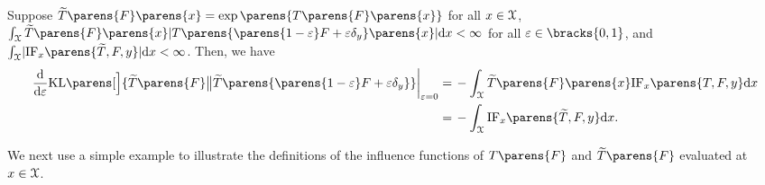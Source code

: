 \begin{proposition}\label{prop-inf-fun-relationship-den-logden-kldiv}
	Suppose $\widetilde{T} \parens{F} \parens{x} = \exp \parens{T \parens{F} \parens{x}}$ for all $x \in \mathcal{X}$, $\int_{\calX} \widetilde{T} \parens{F} \parens{x} \abs{ T \parens{ \parens{1 - \varepsilon} F + \varepsilon \delta_y} \parens{x} } \diff x < \infty$ for all $\varepsilon \in \bracks{0, 1}$, and $\int_{\calX} \abs{\mathrm{IF}_x \parens{\widetilde{T}, F, y}} \diff x < \infty$. Then, we have 
	\begin{align*}
		\frac{\diff}{\diff \varepsilon} \KLdiv \parens[\Big]{ \widetilde{T} \parens{F} \big\Vert \widetilde{T} \parens{ \parens{1 - \varepsilon} F + \varepsilon \delta_y}} \bigg\vert_{\varepsilon=0} = & \, - \int_{\calX} \widetilde{T} \parens{F} \parens{x} \mathrm{IF}_x \parens{T, F, y} \diff x \\ 
		= & \, - \int_{\calX} \mathrm{IF}_x \parens{\widetilde{T}, F, y} \diff x. 
	\end{align*}
\end{proposition}


We next use a simple example to illustrate the definitions of the influence functions of $T \parens{F}$ and $\widetilde{T} \parens{F}$ evaluated at $x \in \mathcal{X}$. 

